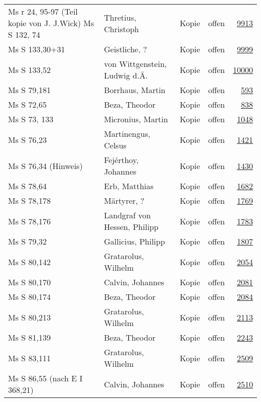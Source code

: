 \documentclass[10pt,a4paper,landscape]{report}
\begin{document}
\begin{longtable}{p{16cm}p{4cm}llr}
Ms r 24, 95-97 (Teil kopie von J. J.Wick) Ms S 132, 74	&	Thretius, Christoph	&	Kopie	&	offen	&	\href{http://130.60.24.72/assignment/9913}{9913}\\
Ms S 133,30+31	&	Geistliche, ?	&	Kopie	&	offen	&	\href{http://130.60.24.72/assignment/9999}{9999}\\
Ms S 133,52	&	von Wittgenstein, Ludwig d.Ä.	&	Kopie	&	offen	&	\href{http://130.60.24.72/assignment/10000}{10000}\\
Ms S 79,181	&	Borrhaus, Martin	&	Kopie	&	offen	&	\href{http://130.60.24.72/assignment/593}{593}\\
Ms S 72,65	&	Beza, Theodor	&	Kopie	&	offen	&	\href{http://130.60.24.72/assignment/838}{838}\\
Ms S 73, 133	&	Micronius, Martin	&	Kopie	&	offen	&	\href{http://130.60.24.72/assignment/1048}{1048}\\
Ms S 76,23	&	Martinengus, Celsus	&	Kopie	&	offen	&	\href{http://130.60.24.72/assignment/1421}{1421}\\
Ms S 76,34 (Hinweis)	&	Fejérthoy, Johannes	&	Kopie	&	offen	&	\href{http://130.60.24.72/assignment/1430}{1430}\\
Ms S 78,64	&	Erb, Matthias	&	Kopie	&	offen	&	\href{http://130.60.24.72/assignment/1682}{1682}\\
Ms S 78,178	&	Märtyrer, ?	&	Kopie	&	offen	&	\href{http://130.60.24.72/assignment/1769}{1769}\\
Ms S 78,176	&	Landgraf von Hessen, Philipp	&	Kopie	&	offen	&	\href{http://130.60.24.72/assignment/1783}{1783}\\
Ms S 79,32	&	Gallicius, Philipp	&	Kopie	&	offen	&	\href{http://130.60.24.72/assignment/1807}{1807}\\
Ms S 80,142	&	Gratarolus, Wilhelm	&	Kopie	&	offen	&	\href{http://130.60.24.72/assignment/2054}{2054}\\
Ms S 80,170	&	Calvin, Johannes	&	Kopie	&	offen	&	\href{http://130.60.24.72/assignment/2081}{2081}\\
Ms S 80,174	&	Beza, Theodor	&	Kopie	&	offen	&	\href{http://130.60.24.72/assignment/2084}{2084}\\
Ms S 80,213	&	Gratarolus, Wilhelm	&	Kopie	&	offen	&	\href{http://130.60.24.72/assignment/2113}{2113}\\
Ms S 81,139	&	Beza, Theodor	&	Kopie	&	offen	&	\href{http://130.60.24.72/assignment/2243}{2243}\\
Ms S 83,111	&	Gratarolus, Wilhelm	&	Kopie	&	offen	&	\href{http://130.60.24.72/assignment/2509}{2509}\\
Ms S 86,55 (nach E I 368,21)	&	Calvin, Johannes	&	Kopie	&	offen	&	\href{http://130.60.24.72/assignment/2510}{2510}\\

\end{longtable}
\end{document}
